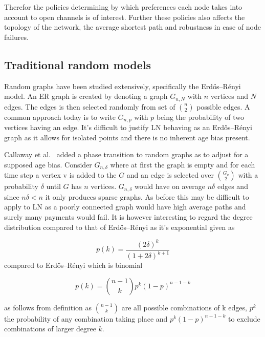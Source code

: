 Therefor the policies determining by which preferences each node takes into account to open channels is of interest. Further these policies also affects the topology of the network, the average shortest path and robustness in case of node failures.

\subsection{Traditional random models}

Random graphs have been studied extensively, specifically the Erdős–Rényi model\cite{erdos:renyi:random:graphs}. An ER graph is created by denoting a graph $G_{n,N}$ with $n$ vertices and $N$ edges. The edges is then selected randomly from set of ${n \choose 2}$ possible edges. A common approach today is to write $G_{n,p}$ with $p$ being the probability of two vertices having an edge. It's difficult to justify LN behaving as an Erdős–Rényi graph as it allows for isolated points and there is no inherent age bias present. 

Callaway et al.~\cite{callaway:hopcraft:randomly:grown:graphs} added a phase transition to random graphs as to adjust for a supposed age bias. Consider $G_{n,\delta}$ where at first the graph is empty and for each time step a vertex v is added to the $G$ and an edge is selected over $G_v \choose 2$ with a probability $\delta$ until $G$ has $n$ vertices. $G_{n,\delta}$ would have on average $n\delta$ edges and since $n\delta < n$ it only produces sparse graphs. As before this may be difficult to apply to LN as a poorly connected graph would have high average paths and surely many payments would fail. It is however interesting to regard the degree distribution compared to that of Erdős–Rényi as it's exponential given as

\begin{equation}
	p(k) = \dfrac{(2\delta)^k}{(1 + 2\delta)^{k+1}} 
	\label{eq:callaway}
\end{equation}
compared to Erdős–Rényi which is binomial

\begin{equation}
	p(k) = {n-1 \choose k} p^k(1-p)^{n-1-k} 
	\label{eq:erdos:renyi}
\end{equation}

as follows from definition as ${n-1 \choose k}$ are all possible combinations of k edges,  $p^k$ the probability of any combination taking place and $p^k(1-p)^{n-1-k}$ to exclude combinations of larger degree $k$.

